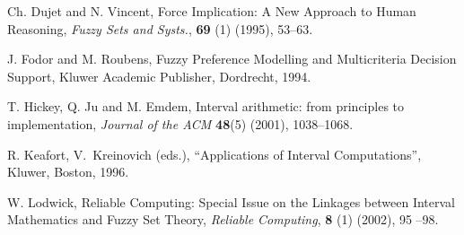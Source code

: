 \documentclass[12pt]{article}
\theoremstyle{plain}
\theoremstyle{remark}
\theoremstyle{definition}
\theoremstyle{proposition}
\begin{document}
\begin{thebibliography}{8}
{  Ch. Dujet and N. Vincent, Force Implication: {A} New Approach to Human Reasoning,
\emph{Fuzzy Sets and Systs.}, \textbf{69} (1) (1995),
53--63.

%
 J. Fodor and M. Roubens, Fuzzy Preference Modelling and Multicriteria Decision Support, Kluwer Academic Publisher, Dordrecht, 1994.


%

 T. Hickey, Q. Ju and M. Emdem, Interval arithmetic: from principles to implementation,
\emph{Journal of the {ACM}} \textbf{48}(5) (2001), 1038--1068.

 R. Keafort,  V.~Kreinovich (eds.), ``Applications of Interval Computations'',
Kluwer, Boston, 1996.



%
W. Lodwick, Reliable Computing: Special Issue on the Linkages
between Interval Mathematics and Fuzzy Set Theory, \emph{Reliable
Computing}, {\bf 8} (1) (2002), 95 --98.



}
\end{thebibliography}
\end{document}
